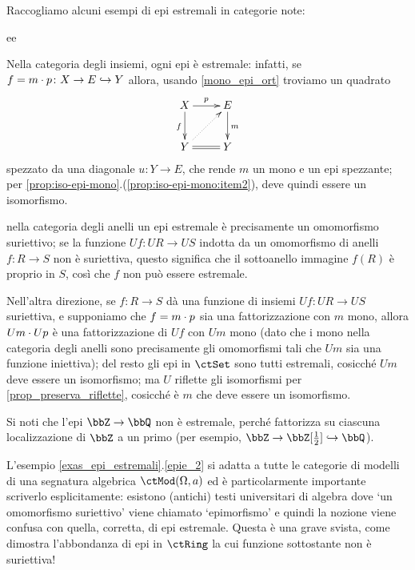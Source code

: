 \begin{remark}\label{exas_epi_estremali}
 Raccogliamo alcuni esempi di epi estremali in categorie note:
 \begin{enumtag}{ee}
  \item \label{ee_1} Nella categoria degli insiemi, ogni epi è estremale: infatti, se \(f = m\cdot p \colon X \to E \hookrightarrow Y\) allora, usando \ref{mono_epi_ort} troviamo un quadrato
  \[\xymatrix{
    X \ar[r]^p\ar[d]_f & E\ar[d]^m \\
    Y \ar@{=}[r]\ar@{.>}[ur] & Y
   }\]
  spezzato da una diagonale \(u \colon Y \to E\), che rende \(m\) un mono e un epi spezzante; per \ref{prop:iso-epi-mono}.(\ref{prop:iso-epi-mono:item2}), deve quindi essere un isomorfismo.
  \item \label{ee_2} nella categoria degli anelli un epi estremale è precisamente un omomorfismo suriettivo; se la funzione \(Uf \colon UR\to US\) indotta da un omomorfismo di anelli \(f \colon R\to S\) non è suriettiva, questo significa che il sottoanello immagine \(f(R)\) è proprio in \(S\), così che \(f\) non può essere estremale.

  Nell'altra direzione, se \(f \colon R\to S\) dà una funzione di insiemi \(Uf \colon UR\to US\) suriettiva, e supponiamo che \(f = m\cdot p\) sia una fattorizzazione con \(m\) mono, allora \(Um\cdot Up\) è una fattorizzazione di \(Uf\) con \(Um\) mono (dato che i mono nella categoria degli anelli sono precisamente gli omomorfismi tali che \(Um\) sia una funzione iniettiva); del resto gli epi in \(\ctSet\) sono tutti estremali, cosicché \(Um\) deve essere un isomorfismo; ma \(U\) riflette gli isomorfismi per \ref{prop_preserva_riflette}, cosicché è \(m\) che deve essere un isomorfismo.

  Si noti che l'epi \(\bbZ\to\bbQ\) non è estremale, perché fattorizza su ciascuna localizzazione di \(\bbZ\) a un primo (per esempio, \(\bbZ \to \bbZ[\frac 12]\mono \bbQ\)).
 \end{enumtag}
\end{remark}
L'esempio \ref{exas_epi_estremali}.\ref{epie_2} si adatta a tutte le categorie di modelli di una segnatura algebrica \(\ctMod(\Omega,a)\) ed è particolarmente importante scriverlo esplicitamente: esistono (antichi) testi universitari di algebra dove `un omomorfismo suriettivo' viene chiamato `epimorfismo' e quindi la nozione viene confusa con quella, corretta, di epi estremale. Questa è una grave svista, come dimostra l'abbondanza di epi in \(\ctRing\) la cui funzione sottostante non è suriettiva!
